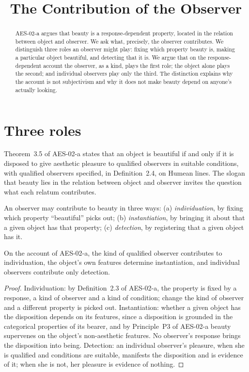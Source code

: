 \documentclass{situationist-preprint}
\title{The Contribution of the Observer}
\begin{document}
\maketitle

\begin{abstract}
AES-02-a argues that beauty is a response-dependent property, located in the relation between object and observer. We ask what, precisely, the observer contributes. We distinguish three roles an observer might play: fixing which property beauty is, making a particular object beautiful, and detecting that it is. We argue that on the response-dependent account the observer, as a kind, plays the first role; the object alone plays the second; and individual observers play only the third. The distinction explains why the account is not subjectivism and why it does not make beauty depend on anyone's actually looking.
\end{abstract}

\section{Three roles}

Theorem~3.5 of AES-02-a states that an object is beautiful if and only if it is disposed to give aesthetic pleasure to qualified observers in suitable conditions, with qualified observers specified, in Definition~2.4, on Humean lines. The slogan that beauty lies in the relation between object and observer invites the question what each relatum contributes.

\begin{definition}\label{d:roles}
An observer may contribute to beauty in three ways: (a) \emph{individuation}, by fixing which property \enquote{beautiful} picks out; (b) \emph{instantiation}, by bringing it about that a given object has that property; (c) \emph{detection}, by registering that a given object has it.
\end{definition}

\begin{proposition}\label{p:roles}
On the account of AES-02-a, the kind of qualified observer contributes to individuation, the object's own features determine instantiation, and individual observers contribute only detection.
\end{proposition}

\begin{proof}
Individuation: by Definition~2.3 of AES-02-a, the property is fixed by a response, a kind of observer and a kind of condition; change the kind of observer and a different property is picked out. Instantiation: whether a given object has the disposition depends on its features, since a disposition is grounded in the categorical properties of its bearer, and by Principle~P3 of AES-02-a beauty supervenes on the object's non-aesthetic features. No observer's response brings the disposition into being. Detection: an individual observer's pleasure, when she is qualified and conditions are suitable, manifests the disposition and is evidence of it; when she is not, her pleasure is evidence of nothing.
\end{proof}
\end{document}
